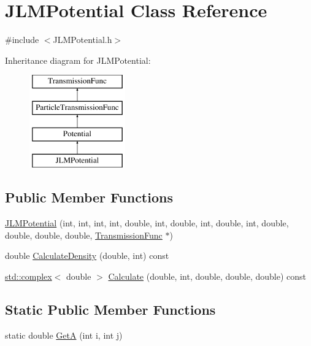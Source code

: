 \hypertarget{classJLMPotential}{\section{J\-L\-M\-Potential Class Reference}
\label{classJLMPotential}
}


{\ttfamily \#include $<$J\-L\-M\-Potential.\-h$>$}

Inheritance diagram for J\-L\-M\-Potential\-:\begin{figure}[H]
\begin{center}
\leavevmode
\includegraphics[height=4.000000cm]{dc/d98/classJLMPotential}
\end{center}
\end{figure}
\subsection*{Public Member Functions}
\begin{DoxyCompactItemize}
\item 
\hyperlink{classJLMPotential_a60af1fcc741ca4bb457160093a4d4149}{J\-L\-M\-Potential} (int, int, int, int, double, int, double, int, double, int, double, double, double, double, \hyperlink{classTransmissionFunc}{Transmission\-Func} $\ast$)
\item 
double \hyperlink{classJLMPotential_afb78b10d84a5454e68c7e1a558662c7f}{Calculate\-Density} (double, int) const 
\item 
\hyperlink{Constants_8h_a1c1b16cc02d518bbe753449171ab7033}{std\-::complex}$<$ double $>$ \hyperlink{classJLMPotential_ae9986807ce14a95a6c6214feea1233c8}{Calculate} (double, int, double, double, double) const 
\end{DoxyCompactItemize}
\subsection*{Static Public Member Functions}
\begin{DoxyCompactItemize}
\item 
static double \hyperlink{classJLMPotential_af8abb42c2334e41bd726a4fb44c05568}{Get\-A} (int i, int j)
\end{DoxyCompactItemize}
